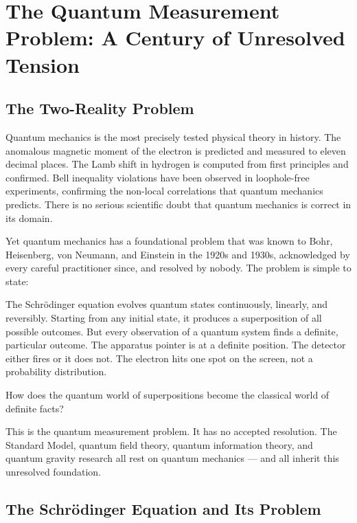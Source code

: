\documentclass[12pt,a4paper]{article}
\begin{document}
\tableofcontents\bigskip

\section{The Quantum Measurement Problem: A Century of Unresolved Tension}\label{sec:measurement}

\subsection{The Two-Reality Problem}

Quantum mechanics is the most precisely tested physical theory in history.  The anomalous magnetic moment of the electron is predicted and measured to eleven decimal places.  The Lamb shift in hydrogen is computed from first principles and confirmed.  Bell inequality violations have been observed in loophole-free experiments, confirming the non-local correlations that quantum mechanics predicts.  There is no serious scientific doubt that quantum mechanics is correct in its domain.

Yet quantum mechanics has a foundational problem that was known to Bohr, Heisenberg, von Neumann, and Einstein in the 1920s and 1930s, acknowledged by every careful practitioner since, and resolved by nobody.  The problem is simple to state:

The Schr\"odinger equation evolves quantum states continuously, linearly, and reversibly.  Starting from any initial state, it produces a superposition of all possible outcomes.  But every observation of a quantum system finds a definite, particular outcome.  The apparatus pointer is at a definite position.  The detector either fires or it does not.  The electron hits one spot on the screen, not a probability distribution.

How does the quantum world of superpositions become the classical world of definite facts?

This is the quantum measurement problem.  It has no accepted resolution.  The Standard Model, quantum field theory, quantum information theory, and quantum gravity research all rest on quantum mechanics --- and all inherit this unresolved foundation.

\subsection{The Schr\"odinger Equation and Its Problem}
\end{document}
